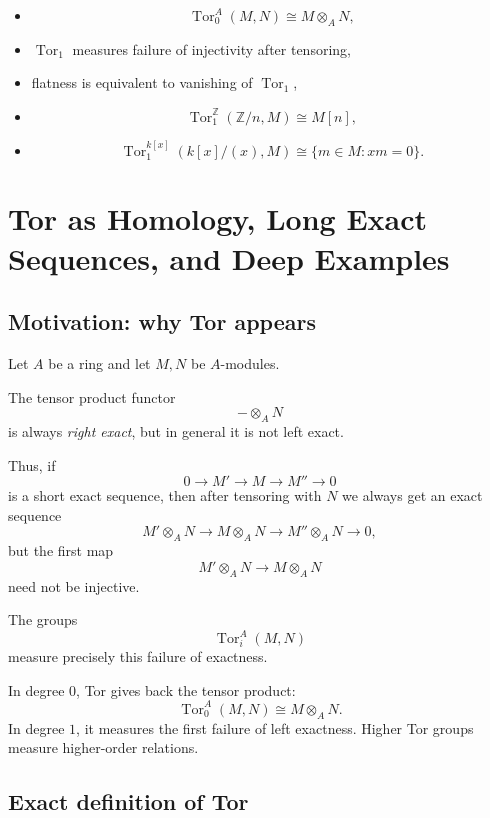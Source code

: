 \documentclass[12pt,a4paper]{article}
\theoremstyle{notespace}
\begin{document}
\begin{itemize}
	\item
	\[
	\operatorname{Tor}_0^A(M,N)\cong M\otimes_A N,
	\]
	
	\item \(\operatorname{Tor}_1\) measures failure of injectivity after tensoring,
	
	\item flatness is equivalent to vanishing of \(\operatorname{Tor}_1\),
	
	\item
	\[
	\operatorname{Tor}_1^{\mathbb Z}(\mathbb Z/n,M)\cong M[n],
	\]
	
	\item
	\[
	\operatorname{Tor}_1^{k[x]}(k[x]/(x),M)
	\cong
	\{m\in M:xm=0\}.
	\]
\end{itemize}

\section{\textbf{Tor as Homology, Long Exact Sequences, and Deep Examples}}

\subsection{Motivation: why Tor appears}

Let \(A\) be a ring and let \(M,N\) be \(A\)-modules.

The tensor product functor
\[
-\otimes_A N
\]
is always \emph{right exact}, but in general it is not left exact.

Thus, if
\[
0\to M' \to M \to M'' \to 0
\]
is a short exact sequence, then after tensoring with \(N\) we always get an exact sequence
\[
M'\otimes_A N \longrightarrow M\otimes_A N \longrightarrow M''\otimes_A N \longrightarrow 0,
\]
but the first map
\[
M'\otimes_A N \longrightarrow M\otimes_A N
\]
need not be injective.

The groups
\[
\operatorname{Tor}_i^A(M,N)
\]
measure precisely this failure of exactness.

In degree \(0\), Tor gives back the tensor product:
\[
\operatorname{Tor}_0^A(M,N)\cong M\otimes_A N.
\]
In degree \(1\), it measures the first failure of left exactness. Higher Tor groups measure higher-order relations.

\subsection{Exact definition of Tor}
\end{document}
